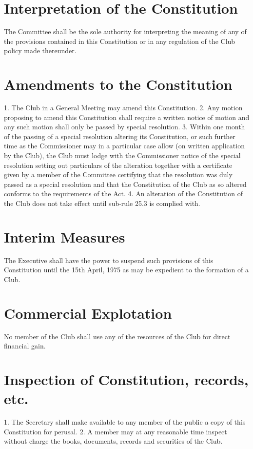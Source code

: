 \documentclass[12pt]{article} %
\begin{document}
\section{Interpretation of the Constitution}
The Committee shall be the sole authority for interpreting the meaning of any of the
provisions contained in this Constitution or in any regulation of the Club policy made
thereunder.

\section{Amendments to the Constitution}
1. The Club in a General Meeting may amend this Constitution.
2. Any motion proposing to amend this Constitution shall require a written notice of
motion and any such motion shall only be passed by special resolution.
3. Within one month of the passing of a special resolution altering its Constitution, or
such further time as the Commissioner may in a particular case allow (on written
application by the Club), the Club must lodge with the Commissioner notice of the
special resolution setting out particulars of the alteration together with a certificate
given by a member of the Committee certifying that the resolution was duly passed as
a special resolution and that the Constitution of the Club as so altered conforms to the
requirements of the Act.
4. An alteration of the Constitution of the Club does not take effect until sub-rule 25.3 is
complied with.

\section{Interim Measures}
The Executive shall have the power to suspend such provisions of this Constitution until the
15th April, 1975 as may be expedient to the formation of a Club.

\section{Commercial Explotation}
No member of the Club shall use any of the resources of the Club for direct financial gain.

\section{Inspection of Constitution, records, etc.}
1. The Secretary shall make available to any member of the public a copy of this
Constitution for perusal.
2. A member may at any reasonable time inspect without charge the books, documents,
records and securities of the Club.
\end{document}
